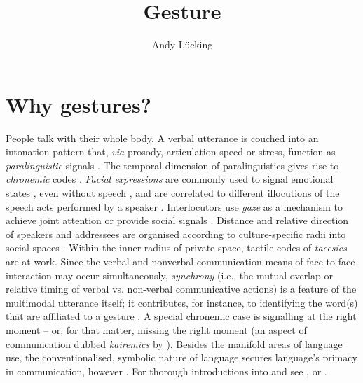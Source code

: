 \documentclass[output=paper]{langsci/langscibook}
\author{Andy Lücking\affiliation{Universit\'{e} de Paris, Goethe-Universität Frankfurt}}
\title{Gesture}
\begin{document}
\label{chap-gesture}

\avmoptions{}

\section{Why gestures?} 
\label{sec:why-gestures}

People talk with their whole body. 
%
A verbal utterance is couched into an intonation pattern that, \textit{via} prosody, articulation speed or stress, function as \emph{paralinguistic}  signals \citep[e.g.][]{Birdwhistell:1970}. 
%
The temporal dimension of paralinguistics gives rise to \emph{chronemic} codes  \citep{Poyatos:1975,Bruneau:1980}. \emph{Facial expressions}  are commonly used to signal emotional states  \citep{Ekman:Friesen:1978}, even without speech \citep{Argyle:1975}, and are correlated to different illocutions of the speech acts performed by a speaker \citep{Domaneschi:Passarelli:Chiorri:2017}.
%
Interlocutors use \emph{gaze}  as a mechanism to achieve joint attention \citep{Argyle:Cook:1976} or provide social signals \citep{Kendon:1967}. 
%
Distance and relative direction of speakers and addressees are organised according to culture-specific radii into social spaces  \citep[\emph{proxemics},][]{Hall:1968}. 
%
Within the inner radius of private space, tactile codes of \emph{tacesics}  \citep{Kauffman:1971} are at work. 
%
Since the verbal and nonverbal communication means of face to face interaction  may occur simultaneously, \emph{synchrony}  (i.e., the mutual overlap or relative timing of verbal vs. non-verbal communicative actions) is a feature of the multimodal utterance itself; it contributes, for instance, to identifying the word(s) that are affiliated to a gesture \citep{Wiltshire:2007}. 
%
A special chronemic case is signalling at the right moment -- or, for that matter, missing the right moment (an aspect of communication dubbed \emph{kairemics}  by \citealp[]{Luecking:Pfeiffer:2012}).
%
Besides the manifold areas of language use, the conventionalised, symbolic nature of language secures language's primacy in communication, however \citep{de:Ruiter:2004}.
%
For thorough introductions into  and  see \citet{Noeth:1990}, \citet{Posner:Robering:Sebeok:1997:2004} or \citet{Mueller:Cienki:Fricke:Ladewig:McNeill:Tessendorf:2013:2014}.
\end{document}
